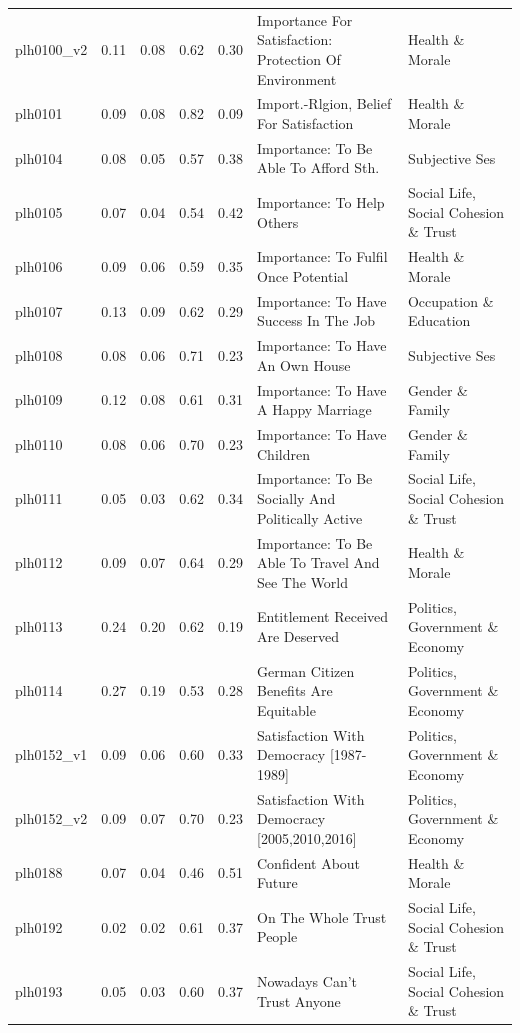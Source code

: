 \documentclass[
  12pt,
]{article}
\begin{document}
\begin{landscape}
\begin{scriptsize}
\begin{longtable}{|p{1.75in}|p{0.3in}|p{0.3in}|p{0.3in}|p{0.3in}|p{2.5in}|p{2.5in}}
plh0100\_v2 & 0.11 & 0.08 & 0.62 & 0.30 & Importance For Satisfaction: Protection Of Environment & Health \& Morale \\ 
plh0101 & 0.09 & 0.08 & 0.82 & 0.09 & Import.-Rlgion, Belief For Satisfaction & Health \& Morale \\ 
plh0104 & 0.08 & 0.05 & 0.57 & 0.38 & Importance: To Be Able To Afford Sth. & Subjective Ses \\ 
plh0105 & 0.07 & 0.04 & 0.54 & 0.42 & Importance: To Help Others & Social Life, Social Cohesion \& Trust \\ 
plh0106 & 0.09 & 0.06 & 0.59 & 0.35 & Importance: To Fulfil Once Potential & Health \& Morale \\ 
plh0107 & 0.13 & 0.09 & 0.62 & 0.29 & Importance: To Have Success In The Job & Occupation \& Education \\ 
plh0108 & 0.08 & 0.06 & 0.71 & 0.23 & Importance: To Have An Own House & Subjective Ses \\ 
plh0109 & 0.12 & 0.08 & 0.61 & 0.31 & Importance: To Have A Happy Marriage & Gender \& Family \\ 
plh0110 & 0.08 & 0.06 & 0.70 & 0.23 & Importance: To Have Children & Gender \& Family \\ 
plh0111 & 0.05 & 0.03 & 0.62 & 0.34 & Importance: To Be Socially And Politically Active & Social Life, Social Cohesion \& Trust \\ 
plh0112 & 0.09 & 0.07 & 0.64 & 0.29 & Importance: To Be Able To Travel And See The World & Health \& Morale \\ 
plh0113 & 0.24 & 0.20 & 0.62 & 0.19 & Entitlement Received Are Deserved & Politics, Government \& Economy \\ 
plh0114 & 0.27 & 0.19 & 0.53 & 0.28 & German Citizen Benefits Are Equitable & Politics, Government \& Economy \\ 
plh0152\_v1 & 0.09 & 0.06 & 0.60 & 0.33 & Satisfaction With Democracy [1987-1989] & Politics, Government \& Economy \\ 
plh0152\_v2 & 0.09 & 0.07 & 0.70 & 0.23 & Satisfaction With Democracy [2005,2010,2016] & Politics, Government \& Economy \\ 
plh0188 & 0.07 & 0.04 & 0.46 & 0.51 & Confident About Future & Health \& Morale \\ 
plh0192 & 0.02 & 0.02 & 0.61 & 0.37 & On The Whole Trust People & Social Life, Social Cohesion \& Trust \\ 
plh0193 & 0.05 & 0.03 & 0.60 & 0.37 & Nowadays Can't Trust Anyone & Social Life, Social Cohesion \& Trust \\ 

\end{longtable}
\end{scriptsize}
\end{landscape}
\end{document}

